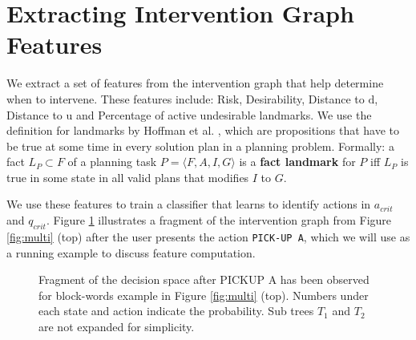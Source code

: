 \documentclass[doctor]{thesis} %
\theoremstyle{plain}
\begin{document}
\section*{Extracting Intervention Graph Features}
\label{sec:features}
We extract a set of features from the intervention graph that help determine when to intervene. These features include: Risk, Desirability, Distance to $\mathrm{d}$, Distance to $\mathrm{u}$ and Percentage of active undesirable landmarks. We use the definition for landmarks by Hoffman et al. , which are propositions that have to be true at some time in every solution plan in a planning problem. Formally: a fact $L_P \subset F$ of a planning task $ P = \langle F, A, I, G \rangle$ is a \textbf{fact landmark} for $P$ iff $L_P$ is true in some state in all valid plans that modifies $I$ to $G$. 

We use these features to train a classifier that learns to identify actions in $a_{crit}$ and $q_{crit}$. Figure \ref{fig:feature} illustrates a fragment of the intervention graph from Figure \ref{fig:multi} (top) after the user presents the action \texttt{PICK-UP A}, which we will use as a running example to discuss feature computation.

\begin{figure}[tb]
        \caption{Fragment of the decision space after PICKUP A has been observed for block-words example in Figure \ref{fig:multi} (top). Numbers under each state and action indicate the probability. Sub trees $T_1$ and $T_2$ are not expanded for simplicity.}
        \label{fig:feature}
\end{figure} 
\end{document}
